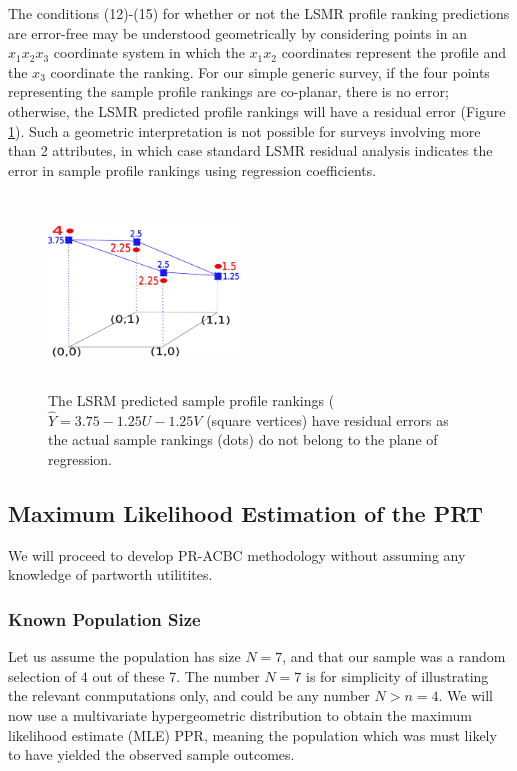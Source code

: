 \documentclass[a4paper, 12pt]{article}
\begin{document}
The conditions  (12)-(15) for whether or not the LSMR  profile ranking predictions are error-free may be understood geometrically by considering points in an $x_1x_2x_3$ coordinate system in which the $x_1x_2$ coordinates represent the profile and the $x_3$ coordinate the ranking. For our simple generic survey,  if the four points representing the sample profile rankings are co-planar, there is no error; otherwise, the LSMR predicted profile rankings will have a residual error (Figure  \ref{sec4fig}).  Such a geometric interpretation  is not possible for surveys involving more than 2 attributes, in which case standard LSMR residual analysis indicates the error in sample  profile rankings using regression coefficients.


\begin{figure}[!htpb]
	\centering
	\includegraphics[width=2in,height=2in]{sec4fig.png}
	\caption{{\small The LSRM predicted sample profile rankings ($\hat{Y}=3.75-1.25U-1.25V$ (square vertices) have residual errors as the actual sample rankings (dots) do not belong to the plane of regression. }}	
	\label{sec4fig}
\end{figure}


\subsection{Maximum Likelihood Estimation of the PRT}
We will proceed to develop PR-ACBC methodology without assuming any knowledge of partworth utilitites.  
\subsubsection{Known Population Size}
Let us assume the population has size $N=7$, and that our sample was a random selection of 4 out of these 7. The number $N=7$ is for simplicity of illustrating the relevant conmputations only, and could be any number $N>n=4$.  We will now use a multivariate hypergeometric distribution to obtain the maximum likelihood estimate (MLE) PPR, meaning the population which was must likely to have yielded the observed sample outcomes.  
\end{document}
